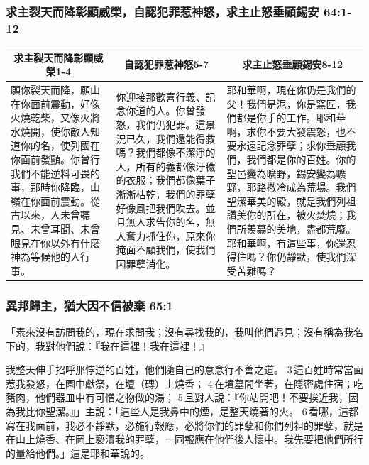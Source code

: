 \subsubsection{求主裂天而降彰顯威榮，自認犯罪惹神怒，求主止怒垂顧錫安 64:1-12}
\begin{table}[H]
\centering
\begin{tabular}{p{}|p{}|p{6.750cm}}\hline\hline
\multicolumn{1}{c|}{求主裂天而降彰顯威榮1-4}&\multicolumn{1}{c|}{自認犯罪惹神怒5-7}&\multicolumn{1}{c}{求主止怒垂顧錫安8-12}\\\hline
願你裂天而降，願山在你面前震動，好像火燒乾柴，又像火將水燒開，使你敵人知道你的名，使列國在你面前發顫。你曾行我們不能逆料可畏的事，那時你降臨，山嶺在你面前震動。從古以來，人未曾聽見、未曾耳聞、未曾眼見在你以外有什麼神為等候他的人行事。
&你迎接那歡喜行義、記念你道的人。你曾發怒，我們仍犯罪。這景況已久，我們還能得救嗎？我們都像不潔淨的人，所有的義都像汙穢的衣服；我們都像葉子漸漸枯乾，我們的罪孽好像風把我們吹去。並且無人求告你的名，無人奮力抓住你，原來你掩面不顧我們，使我們因罪孽消化。
&耶和華啊，現在你仍是我們的父！我們是泥，你是窯匠，我們都是你手的工作。耶和華啊，求你不要大發震怒，也不要永遠記念罪孽；求你垂顧我們，我們都是你的百姓。你的聖邑變為曠野，錫安變為曠野，耶路撒冷成為荒場。我們聖潔華美的殿，就是我們列祖讚美你的所在，被火焚燒；我們所羨慕的美地，盡都荒廢。耶和華啊，有這些事，你還忍得住嗎？你仍靜默，使我們深受苦難嗎？\\\hline
\end{tabular}
\end{table}

\subsubsection{異邦歸主，猶大因不信被棄 65:1}
「素來沒有訪問我的，現在求問我；沒有尋找我的，我叫他們遇見；沒有稱為我名下的，我對他們說：『我在這裡！我在這裡！』

我整天伸手招呼那悖逆的百姓，他們隨自己的意念行不善之道。 3 這百姓時常當面惹我發怒，在園中獻祭，在壇（磚）上燒香； 4 在墳墓間坐著，在隱密處住宿；吃豬肉，他們器皿中有可憎之物做的湯； 5 且對人說：『你站開吧！不要挨近我，因為我比你聖潔。』」主說：「這些人是我鼻中的煙，是整天燒著的火。 6 看哪，這都寫在我面前，我必不靜默，必施行報應，必將你們的罪孽和你們列祖的罪孽，就是在山上燒香、在岡上褻瀆我的罪孽，一同報應在他們後人懷中。我先要把他們所行的量給他們。」這是耶和華說的。


